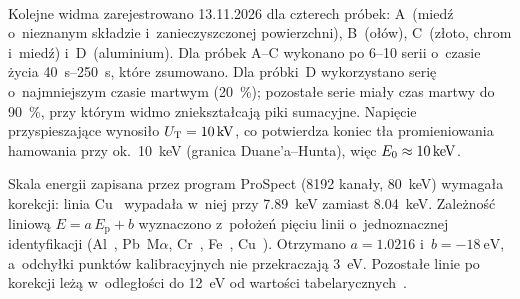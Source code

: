 
\paragraph{}
\label{sec:widma-probki}

Kolejne widma zarejestrowano 13.11.2026 dla czterech próbek: A~(miedź o~nieznanym
składzie i~zanieczyszczonej powierzchni), B~(ołów), C~(złoto, chrom i~miedź) i~D~(aluminium).
Dla próbek A--C wykonano po 6--10 serii o~czasie życia
\SIrange{40}{250}{\second}, które zsumowano. Dla próbki~D wykorzystano serię
o~najmniejszym czasie martwym (\SI{20}{\percent}); pozostałe serie miały czas
martwy do \SI{90}{\percent}, przy którym widmo zniekształcają piki sumacyjne. Napięcie przyspieszające wynosiło
$U_\mathrm{T}=\SI{10}{\kilo\volt}$, co potwierdza koniec tła promieniowania hamowania
przy ok.~\SI{10}{\kilo\electronvolt} (granica Duane'a--Hunta), więc
$E_0\approx\SI{10}{\kilo\electronvolt}$.

Skala energii zapisana przez program ProSpect (\num{8192} kanały,
\SI{80}{\kilo\electronvolt}) wymagała korekcji: linia Cu~\Ka{} wypadała
w~niej przy \SI{7.89}{\kilo\electronvolt} zamiast \SI{8.04}{\kilo\electronvolt}.
Zależność liniową $E = a\,E_\mathrm{p} + b$ wyznaczono z~położeń pięciu linii
o~jednoznacznej identyfikacji (Al~\Ka, Pb~M$\alpha$, Cr~\Ka, Fe~\Ka, Cu~\Ka).
Otrzymano $a = \num{1.0216}$ i~$b = \SI{-18}{\electronvolt}$, a~odchyłki
punktów kalibracyjnych nie przekraczają \SI{3}{\electronvolt}.
Pozostałe linie po korekcji leżą w~odległości do \SI{12}{\electronvolt}
od wartości tabelarycznych~\cite{goldstein2018sem}.


